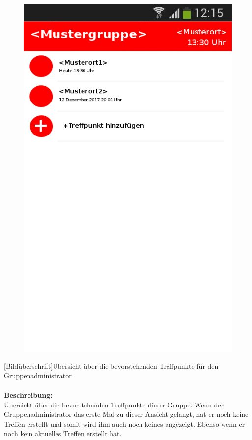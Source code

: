 \begin{figure}
	\includegraphics[scale =1]{resources/images/treffpunktuebersicht_Admin.png}
\end{figure}
[Bildüberschrift]Übersicht über die bevorstehenden Treffpunkte für den Gruppenadministrator\\ \\
\textbf{Beschreibung:}\\
Übersicht über die bevorstehenden Treffpunkte dieser Gruppe. Wenn der Gruppenadministrator das erste Mal zu dieser Ansicht gelangt, hat er noch keine Treffen erstellt und somit wird ihm auch noch keines angezeigt. Ebenso wenn er noch kein aktuelles Treffen erstellt hat.\\
